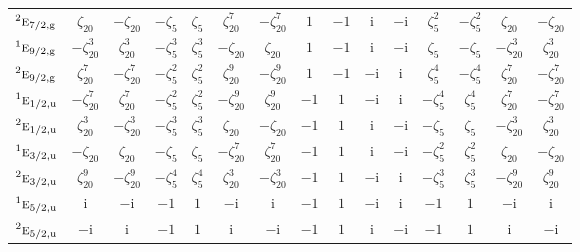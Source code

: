 \documentclass[10pt,a4paper]{article}
\numberwithin{equation}{section}
\newcommand{\irr}[1]{\text{\normalfont\scshape #1}}
\newcommand{\conjpair}[1]{{}^{#1}}
\newcommand{\ptag}[1]{\mathrm{#1}}
\newcommand{\iunit}{\mathrm{i}}
\newcommand{\rootunity}[1]{\zeta_{#1}}
\begin{document}
{\begin{longtable}{@{}lcccccccccccccc@{}}
$\conjpair{2}\irr{e}_{7/2,\ptag{g}}$ & $\rootunity{20}$ & $-\rootunity{20}$ & $-\rootunity{5}$ & $\rootunity{5}$ & $\rootunity{20}^{7}$ & $-\rootunity{20}^{7}$ & $1$ & $-1$ & $\iunit{}$ & $-\iunit{}$ & $\rootunity{5}^{2}$ & $-\rootunity{5}^{2}$ & $\rootunity{20}$ & $-\rootunity{20}$\\
$\conjpair{1}\irr{e}_{9/2,\ptag{g}}$ & $-\rootunity{20}^{3}$ & $\rootunity{20}^{3}$ & $-\rootunity{5}^{3}$ & $\rootunity{5}^{3}$ & $-\rootunity{20}$ & $\rootunity{20}$ & $1$ & $-1$ & $\iunit{}$ & $-\iunit{}$ & $\rootunity{5}$ & $-\rootunity{5}$ & $-\rootunity{20}^{3}$ & $\rootunity{20}^{3}$\\
$\conjpair{2}\irr{e}_{9/2,\ptag{g}}$ & $\rootunity{20}^{7}$ & $-\rootunity{20}^{7}$ & $-\rootunity{5}^{2}$ & $\rootunity{5}^{2}$ & $\rootunity{20}^{9}$ & $-\rootunity{20}^{9}$ & $1$ & $-1$ & $-\iunit{}$ & $\iunit{}$ & $\rootunity{5}^{4}$ & $-\rootunity{5}^{4}$ & $\rootunity{20}^{7}$ & $-\rootunity{20}^{7}$\\
$\conjpair{1}\irr{e}_{1/2,\ptag{u}}$ & $-\rootunity{20}^{7}$ & $\rootunity{20}^{7}$ & $-\rootunity{5}^{2}$ & $\rootunity{5}^{2}$ & $-\rootunity{20}^{9}$ & $\rootunity{20}^{9}$ & $-1$ & $1$ & $-\iunit{}$ & $\iunit{}$ & $-\rootunity{5}^{4}$ & $\rootunity{5}^{4}$ & $\rootunity{20}^{7}$ & $-\rootunity{20}^{7}$\\
$\conjpair{2}\irr{e}_{1/2,\ptag{u}}$ & $\rootunity{20}^{3}$ & $-\rootunity{20}^{3}$ & $-\rootunity{5}^{3}$ & $\rootunity{5}^{3}$ & $\rootunity{20}$ & $-\rootunity{20}$ & $-1$ & $1$ & $\iunit{}$ & $-\iunit{}$ & $-\rootunity{5}$ & $\rootunity{5}$ & $-\rootunity{20}^{3}$ & $\rootunity{20}^{3}$\\
$\conjpair{1}\irr{e}_{3/2,\ptag{u}}$ & $-\rootunity{20}$ & $\rootunity{20}$ & $-\rootunity{5}$ & $\rootunity{5}$ & $-\rootunity{20}^{7}$ & $\rootunity{20}^{7}$ & $-1$ & $1$ & $\iunit{}$ & $-\iunit{}$ & $-\rootunity{5}^{2}$ & $\rootunity{5}^{2}$ & $\rootunity{20}$ & $-\rootunity{20}$\\
$\conjpair{2}\irr{e}_{3/2,\ptag{u}}$ & $\rootunity{20}^{9}$ & $-\rootunity{20}^{9}$ & $-\rootunity{5}^{4}$ & $\rootunity{5}^{4}$ & $\rootunity{20}^{3}$ & $-\rootunity{20}^{3}$ & $-1$ & $1$ & $-\iunit{}$ & $\iunit{}$ & $-\rootunity{5}^{3}$ & $\rootunity{5}^{3}$ & $-\rootunity{20}^{9}$ & $\rootunity{20}^{9}$\\
$\conjpair{1}\irr{e}_{5/2,\ptag{u}}$ & $\iunit{}$ & $-\iunit{}$ & $-1$ & $1$ & $-\iunit{}$ & $\iunit{}$ & $-1$ & $1$ & $-\iunit{}$ & $\iunit{}$ & $-1$ & $1$ & $-\iunit{}$ & $\iunit{}$\\
$\conjpair{2}\irr{e}_{5/2,\ptag{u}}$ & $-\iunit{}$ & $\iunit{}$ & $-1$ & $1$ & $\iunit{}$ & $-\iunit{}$ & $-1$ & $1$ & $\iunit{}$ & $-\iunit{}$ & $-1$ & $1$ & $\iunit{}$ & $-\iunit{}$\\

\end{longtable}}
\end{document}

